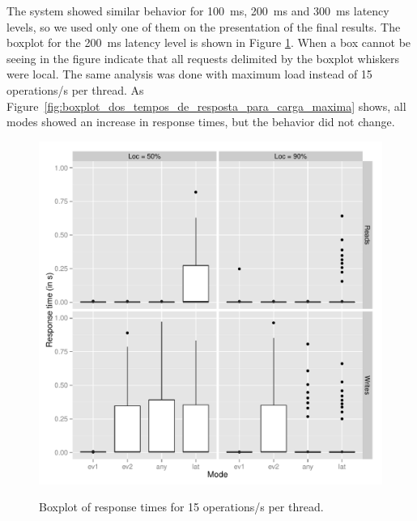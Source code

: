 \documentclass[doublespacing]{bmcart}
\begin{document}
The system showed similar behavior for 100~ms, 200~ms and 300~ms latency levels, so we used only one of them on the presentation of the final results. The boxplot for the 200~ms latency level is shown in Figure \ref{fig:boxplot_dos_tempos_de_resposta}.
When a box cannot be seeing in the figure indicate that all requests delimited
by the boxplot whiskers were local. The same analysis was done with maximum load
instead of 15 operations/s per thread. As
Figure~\ref{fig:boxplot_dos_tempos_de_resposta_para_carga_maxima} shows, all
modes showed an increase in response times, but the behavior did not change.

\begin{figure}[h!]
\caption{Boxplot of response times for 15 operations/s per thread.}
\includegraphics[width=1.0\textwidth]{boxplot200.png}
\label{fig:boxplot_dos_tempos_de_resposta}
\end{figure}
\end{document}
